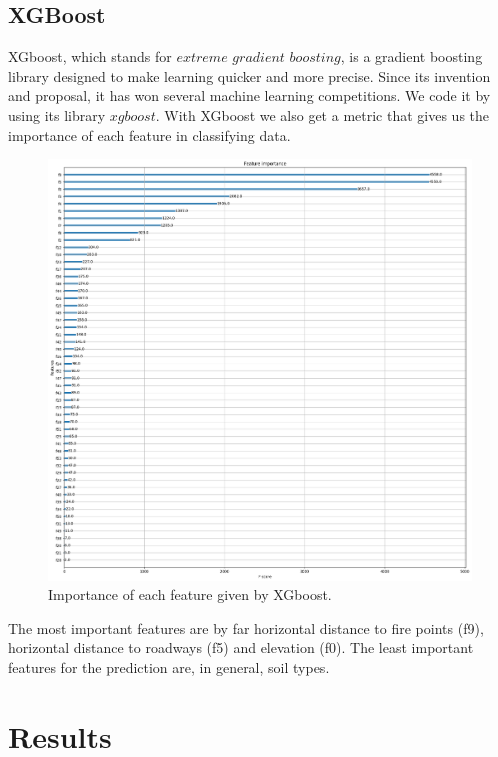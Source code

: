 \documentclass[letterpaper,12pt]{article}
\begin{document}
\subsection{XGBoost}
XGboost, which stands for $extreme$ $gradient$ $boosting$, is a gradient boosting library designed to make learning quicker and more precise. Since its invention and proposal, it has won several machine learning competitions.
We code it by using its library $xgboost$. With XGboost we also get a metric that gives us the importance of each feature in classifying data.
\begin{figure}[H]
    \centering
    \includegraphics[width=13cm]{FeatImp.png}
    \caption{\centering Importance of each feature given by XGboost.}
    \label{cross}
\end{figure}
The most important features are by far horizontal distance to fire points (f9), horizontal distance to roadways (f5) and elevation (f0). The least important features for the prediction are, in general, soil types.
\newpage
\section{Results}
\end{document}
